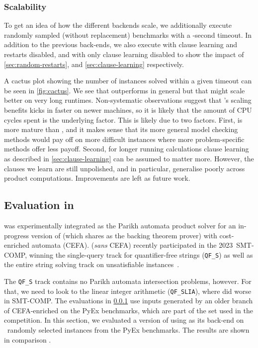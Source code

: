 \subsubsection{Scalability}\label{sec:scaling}%
To get an idea of how the different backends scale, we additionally execute
 randomly sampled (without replacement) benchmarks with a
-second timeout. In addition to the previous back-ends, we also
execute \Calculus{} with clause learning and restarts disabled, and with only
clause learning disabled to show the impact of \cref{sec:random-restarts}, and
\cref{sec:clause-learning} respectively.

A cactus plot showing the number of instances solved within a given timeout can
be seen in \cref{fig:cactus}. We see that \Calculus{} outperforms \Nuxmv{} in
general but that \Nuxmv{} might scale better on very long runtimes.
Non-systematic observations suggest that \Nuxmv{}'s scaling benefits kicks in
faster on newer machines, so it is likely that the amount of CPU cycles spent is
the underlying factor. This is likely due to two factors. First, \Nuxmv{} is
more mature than \Calculus{}, and it makes sense that its more general model
checking methods would pay off on more difficult instances where more
problem-specific methods offer less payoff. Second, for longer running
calculations clause learning as described in \cref{sec:clause-learning} can be
assumed to matter more. However, the clauses we learn are still unpolished, and
in particular, generalise poorly across product computations. Improvements are
left as future work.

\subsection{Evaluation in \Ostrich{}}\label{}%
\Catra{} was experimentally integrated as the Parikh automata product solver for
an in-progress version of \Ostrich{} (which shares \Princess{} as the backing
theorem prover) with cost-enriched automata (CEFA). \Ostrich{} (\textit{sans}
CEFA) recently participated in the 2023~SMT-COMP, winning the single-query track
for quantifier-free strings (\texttt{QF\_S}) as well as the entire string
solving track on unsatisfiable instances~\cite{smt-comp-23}.

The \texttt{QF\_S} track contains no Parikh automata intersection problems,
however. For that, we need to look to the linear integer arithmetic
(\texttt{QF\_SLIA}), where \Ostrich{} did worse in SMT-COMP. The evaluations in
\cref{sec:scaling} use inputs generated by an older branch of CEFA-enriched
\Ostrich{} on the PyEx benchmarks, which are part of the set used in the
competition. In this section, we evaluated a version of \Ostrich{} using
\Catra{} as its back-end 
on ~randomly selected instances from the PyEx benchmarks. The
results are shown in comparison .

